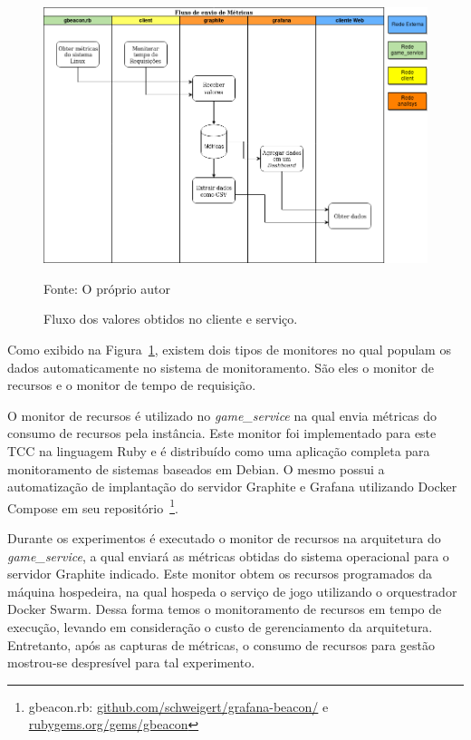 \begin{figure}[htb!]
    \caption{Fluxo dos valores obtidos no cliente e serviço.}
    \label{fig:fluxo_data}
    \includegraphics[width=\textwidth]{img/cap5/fluxo_metricas.png}
    \centering
    
    Fonte: O próprio autor
\end{figure}

Como exibido na Figura~\ref{fig:fluxo_data}, existem dois tipos de monitores no qual populam os dados automaticamente no sistema de monitoramento.
%
São eles o monitor de recursos e  o monitor de tempo de requisição. 

O monitor de recursos é utilizado no \textit{game\_service} na qual envia métricas do consumo de recursos pela instância.
%
Este monitor foi implementado para este TCC na linguagem Ruby e é distribuído como uma aplicação completa para monitoramento de sistemas baseados em Debian.
%
O mesmo possui a automatização de implantação do servidor Graphite e Grafana utilizando Docker Compose em seu repositório~\footnote{gbeacon.rb: \url{github.com/schweigert/grafana-beacon/} e \url{rubygems.org/gems/gbeacon}}.

Durante os experimentos é executado o monitor de recursos na arquitetura do \textit{game\_service}, a qual enviará as métricas obtidas do sistema operacional para o servidor Graphite indicado.
%
Este monitor obtem os recursos programados da máquina hospedeira, na qual hospeda o serviço de jogo utilizando o orquestrador Docker Swarm.
%
Dessa forma temos o monitoramento de recursos em tempo de execução, levando em consideração o custo de gerenciamento da arquitetura.
%
Entretanto, após as capturas de métricas, o consumo de recursos para gestão mostrou-se despresível para tal experimento.

